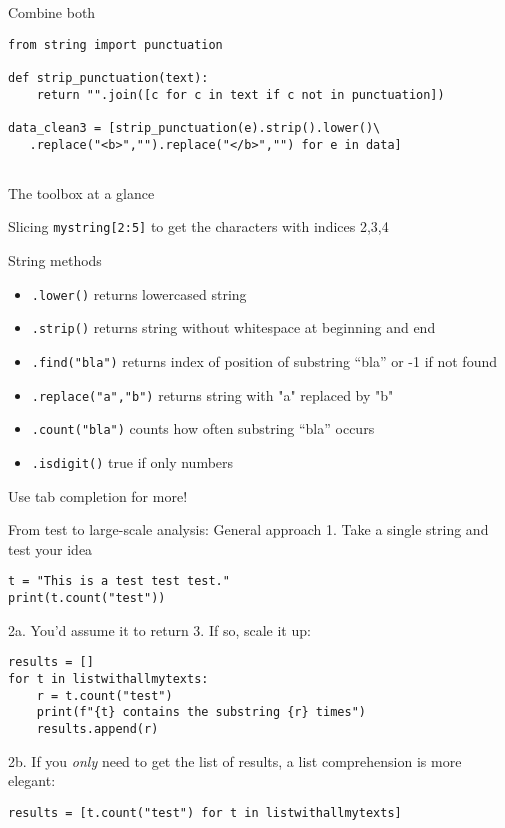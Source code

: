 \begin{frame}[fragile]{Combine both}
\begin{verbatim}
from string import punctuation

def strip_punctuation(text):
    return "".join([c for c in text if c not in punctuation])

data_clean3 = [strip_punctuation(e).strip().lower()\
   .replace("<b>","").replace("</b>","") for e in data]
    
\end{verbatim}
\end{frame}




\begin{frame}{The toolbox at a glance}
  \footnotesize
\begin{block}{Slicing}
\texttt{mystring[2:5]} to get the characters with indices 2,3,4
\end{block}

\begin{block}{String methods}
\begin{itemize}
	\item \texttt{.lower()} returns lowercased string
	\item \texttt{.strip()} returns string without whitespace at beginning and end
	\item \texttt{.find("bla")} returns index of position of substring ``bla'' or -1 if not found
	\item \texttt{.replace("a","b")} returns string with "a" replaced by "b"
	\item \texttt{.count("bla")} counts how often substring ``bla'' occurs
        \item \texttt{.isdigit()} true if only numbers
          
\end{itemize}
Use tab completion for more!
\end{block}
\end{frame}




\begin{frame}[fragile]{From test to large-scale analysis: General approach}
1. Take a single string and test your idea
\begin{lstlisting}
t = "This is a test test test."
print(t.count("test"))
\end{lstlisting}
2a. You'd assume it to return 3. If so, scale it up:
\begin{lstlisting}
results = []
for t in listwithallmytexts:
    r = t.count("test")
    print(f"{t} contains the substring {r} times")
    results.append(r)
\end{lstlisting}

2b. If you \emph{only} need to get the list of results, a list comprehension is more elegant:
\begin{lstlisting}
results = [t.count("test") for t in listwithallmytexts]
\end{lstlisting}


\end{frame}


